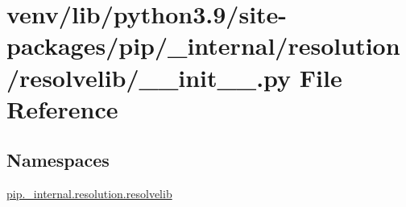 \hypertarget{venv_2lib_2python3_89_2site-packages_2pip_2__internal_2resolution_2resolvelib_2____init_____8py}{}\section{venv/lib/python3.9/site-\/packages/pip/\+\_\+internal/resolution/resolvelib/\+\_\+\+\_\+init\+\_\+\+\_\+.py File Reference}
\label{venv_2lib_2python3_89_2site-packages_2pip_2__internal_2resolution_2resolvelib_2____init_____8py}
\subsection*{Namespaces}
\begin{DoxyCompactItemize}
\item 
 \hyperlink{namespacepip_1_1__internal_1_1resolution_1_1resolvelib}{pip.\+\_\+internal.\+resolution.\+resolvelib}
\end{DoxyCompactItemize}
